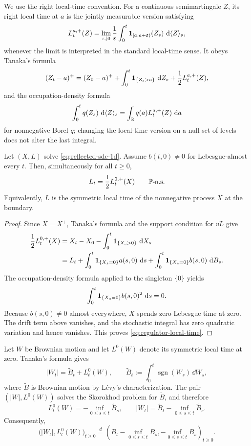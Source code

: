 We use the right local-time convention. For a continuous semimartingale $Z$,
its right local time at $a$ is the jointly measurable version satisfying
\begin{equation}
  L_t^{a,+}(Z)
  =\lim_{\varepsilon\downarrow0}
     \frac1\varepsilon
     \int_0^t\1_{[a,a+\varepsilon)}(Z_s)\,\dd\langle Z\rangle_s, \label{eq:right-local-time}
\end{equation}
whenever the limit is interpreted in the standard local-time sense. It obeys
Tanaka's formula
\begin{equation}
  (Z_t-a)^+
  =(Z_0-a)^+
   +\int_0^t\1_{\{Z_s>a\}}\,\dd Z_s
   +\frac12L_t^{a,+}(Z), \label{eq:tanaka-right}
\end{equation}
and the occupation-density formula
\[
  \int_0^t q(Z_s)\,\dd\langle Z\rangle_s
  =\int_{\R}q(a)L_t^{a,+}(Z)\,\dd a
\]
for nonnegative Borel $q$; changing the local-time version on a null set of
levels does not alter the last integral.

\begin{theorem}
Let $(X,L)$ solve \eqref{eq:reflected-sde-1d}. Assume
$b(t,0)\neq0$ for Lebesgue-almost every $t$. Then, simultaneously for all
$t\geq0$,
\begin{equation}
  L_t=\frac12L_t^{0,+}(X)\qquad\P\text{-a.s.} \label{eq:regulator-local-time}
\end{equation}
Equivalently, $L$ is the symmetric local time of the nonnegative process $X$
at the boundary.
\end{theorem}

\begin{proof}
Since $X=X^+$, Tanaka's formula and the support condition for $\dd L$ give
\begin{align*}
  \frac12L_t^{0,+}(X)
  &=X_t-X_0-
    \int_0^t\1_{\{X_s>0\}}\,\dd X_s\\
  &=L_t+
    \int_0^t\1_{\{X_s=0\}}a(s,0)\,\dd s
    +\int_0^t\1_{\{X_s=0\}}b(s,0)\,\dd B_s.
\end{align*}
The occupation-density formula applied to the singleton $\{0\}$ yields
\[
  \int_0^t\1_{\{X_s=0\}}b(s,0)^2\,\dd s=0.
\]
Because $b(s,0)\neq0$ almost everywhere, $X$ spends zero Lebesgue time at
zero. The drift term above vanishes, and the stochastic integral has zero
quadratic variation and hence vanishes. This proves
\eqref{eq:regulator-local-time}.
\end{proof}

\begin{example}
Let $W$ be Brownian motion and let $L^0(W)$ denote its symmetric local time at
zero. Tanaka's formula gives
\[
  |W_t|=\widetilde B_t+L_t^0(W),
  \qquad
  \widetilde B_t:=\int_0^t\operatorname{sgn}(W_s)\,\dd W_s,
\]
where $\widetilde B$ is Brownian motion by L\'evy's characterization. The pair
$(|W|,L^0(W))$ solves the Skorokhod problem for $\widetilde B$, and therefore
\[
  L_t^0(W)=-\inf_{0\leq s\leq t}\widetilde B_s,
  \qquad
  |W_t|=\widetilde B_t-\inf_{0\leq s\leq t}\widetilde B_s.
\]
Consequently,
\[
  \bigl(|W_t|,L_t^0(W)\bigr)_{t\geq0}
  \overset{d}{=}
  \left(
    B_t-\inf_{0\leq s\leq t}B_s,
    -\inf_{0\leq s\leq t}B_s
  \right)_{t\geq0}.
\]
\end{example}
